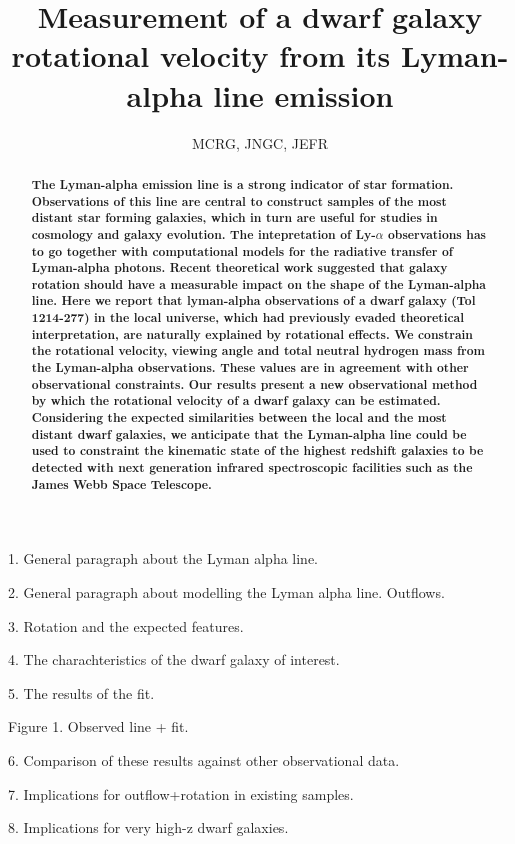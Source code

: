 \documentclass{article}
\title{Measurement of a dwarf galaxy rotational velocity from its Lyman-alpha
  line emission}
\author{MCRG, JNGC, JEFR}
\begin{document}
\maketitle
\begin{abstract}
{\bf The Lyman-alpha emission line is a strong indicator of star formation.
Observations of this line are central to construct samples of the most
distant star forming galaxies, which in turn are useful for studies in
cosmology and galaxy evolution.  
The intepretation of Ly-$\alpha$ observations has to go together with
computational models for the radiative transfer of Lyman-alpha photons.
Recent theoretical work suggested that galaxy rotation should have a
measurable impact on the shape of the Lyman-alpha line. 
Here we report that lyman-alpha observations of a dwarf galaxy (Tol
1214-277) in the local universe, which had previously evaded theoretical 
interpretation, are naturally explained by rotational effects.
We constrain the rotational velocity, viewing angle and total
neutral hydrogen mass from the Lyman-alpha observations.
These values are in agreement with other observational constraints.
Our results present a new observational method by which the rotational
velocity of a dwarf galaxy can be estimated. 
Considering the expected similarities between the local and the most
distant dwarf galaxies, we anticipate that the Lyman-alpha line could be
used to constraint the kinematic state of the highest redshift
galaxies to be detected with next generation infrared spectroscopic
facilities such as the James Webb Space Telescope.}

\end{abstract}

1. General paragraph about the Lyman alpha line.

2. General paragraph about modelling the Lyman alpha
line. Outflows.

3. Rotation and the expected features.

4. The charachteristics of the dwarf galaxy of interest.

5. The results of the fit. 

Figure 1. Observed line + fit. 

6. Comparison of these results against other observational data.

7. Implications for outflow+rotation in existing samples.

8. Implications for very high-z dwarf galaxies. 
\end{document}
